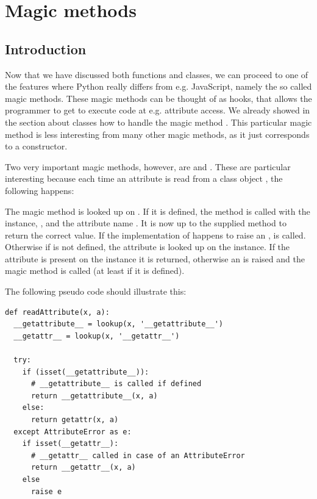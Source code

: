 \chapter{Magic methods}
\section{Introduction}
Now that we have discussed both functions and classes, we can proceed to one of the features where Python really differs from e.g. JavaScript, namely the so called magic methods. These magic methods can be thought of as hooks, that allows the programmer to get to execute code at e.g. attribute access. We already showed in the section about classes how to handle the magic method . This particular magic method is less interesting from many other magic methods, as it just corresponds to a constructor.

Two very important magic methods, however, are  and . These are particular interesting because each time an attribute  is read from a class object , the following happens:

The magic method  is looked up on . If it is defined, the method is called with the instance, , and the attribute name . It is now up to the supplied method to return the correct value. If the implementation of  happens to raise an ,  is called. Otherwise if  is not defined, the attribute is looked up on the instance. If the attribute is present on the instance it is returned, otherwise an  is raised and the magic method  is called (at least if it is defined).

The following pseudo code should illustrate this:

\begin{listing}[H]
	\begin{verbatim}
def readAttribute(x, a):
  __getattribute__ = lookup(x, '__getattribute__')
  __getattr__ = lookup(x, '__getattr__')

  try:
    if (isset(__getattribute__)):
      # __getattribute__ is called if defined
      return __getattribute__(x, a)
    else:
      return getattr(x, a)
  except AttributeError as e:
    if isset(__getattr__):
      # __getattr__ called in case of an AttributeError
      return __getattr__(x, a)
    else
      raise e
	\end{verbatim}
\end{listing}

